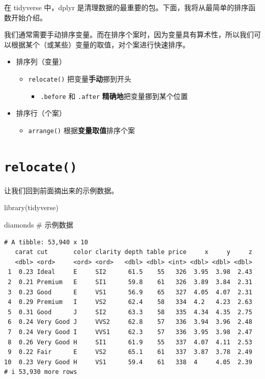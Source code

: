 \documentclass[
  letterpaper,
]{ctexbook}
\newenvironment{Shaded}{\begin{snugshade}}{\end{snugshade}}
\newcommand{\CommentTok}[1]{\textcolor[rgb]{0.37,0.37,0.37}{#1}}
\newcommand{\FunctionTok}[1]{\textcolor[rgb]{0.28,0.35,0.67}{#1}}
\newcommand{\NormalTok}[1]{\textcolor[rgb]{0.00,0.23,0.31}{#1}}
\providecommand{\tightlist}{%
  \setlength{\itemsep}{0pt}\setlength{\parskip}{0pt}}\usepackage{longtable,booktabs,array}
\begin{document}
在 tidyverse 中，dplyr
是清理数据的最重要的包。下面，我将从最简单的排序函数开始介绍。

我们通常需要手动排序变量。而在排序个案时，因为变量具有算术性，所以我们可以根据某个（或某些）变量的取值，对个案进行快速排序。

\begin{itemize}
\tightlist
\item
  排序列（变量）

  \begin{itemize}
  \tightlist
  \item
    \texttt{relocate()} 把变量{\textbf{手动}}挪到开头

    \begin{itemize}
    \tightlist
    \item
      \texttt{.before} 和 \texttt{.after}
      {\textbf{精确地}}把变量挪到某个位置
    \end{itemize}
  \end{itemize}
\item
  排序行（个案）

  \begin{itemize}
  \tightlist
  \item
    \texttt{arrange()} 根据{\textbf{变量取值}}排序个案
  \end{itemize}
\end{itemize}

\hypertarget{relocate}{%
\section{\texorpdfstring{\texttt{relocate()}}{relocate()}}\label{relocate}}

让我们回到前面摘出来的示例数据。

\begin{Shaded}
\begin{Highlighting}[]
\FunctionTok{library}\NormalTok{(tidyverse)}

\NormalTok{diamonds }\CommentTok{\# 示例数据}
\end{Highlighting}
\end{Shaded}

\begin{verbatim}
# A tibble: 53,940 x 10
   carat cut       color clarity depth table price     x     y     z
   <dbl> <ord>     <ord> <ord>   <dbl> <dbl> <int> <dbl> <dbl> <dbl>
 1  0.23 Ideal     E     SI2      61.5    55   326  3.95  3.98  2.43
 2  0.21 Premium   E     SI1      59.8    61   326  3.89  3.84  2.31
 3  0.23 Good      E     VS1      56.9    65   327  4.05  4.07  2.31
 4  0.29 Premium   I     VS2      62.4    58   334  4.2   4.23  2.63
 5  0.31 Good      J     SI2      63.3    58   335  4.34  4.35  2.75
 6  0.24 Very Good J     VVS2     62.8    57   336  3.94  3.96  2.48
 7  0.24 Very Good I     VVS1     62.3    57   336  3.95  3.98  2.47
 8  0.26 Very Good H     SI1      61.9    55   337  4.07  4.11  2.53
 9  0.22 Fair      E     VS2      65.1    61   337  3.87  3.78  2.49
10  0.23 Very Good H     VS1      59.4    61   338  4     4.05  2.39
# i 53,930 more rows
\end{verbatim}
\end{document}
